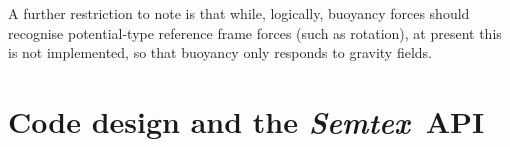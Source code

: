 \documentclass[11pt]{report}
\newcommand{\Semtex}{\emph{Semtex}} \newcommand{\Dog}{\emph{Dog}}
\newcommand\threed{three-di\-men\-sion\-al}
\begin{document}
A further restriction to note is that while, logically, buoyancy
forces should recognise potential-type reference frame forces (such as
rotation), at present this is not implemented, so that buoyancy only
responds to gravity fields.









\chapter{Code design and the \Semtex\ API}
\label{ch.api}
\end{document}
